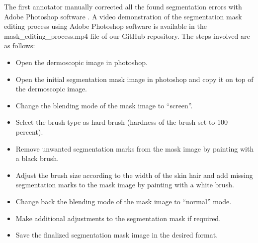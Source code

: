 The first annotator manually corrected all the found segmentation errors with Adobe Photoshop software \cite{Photoshop}. A video demonstration of the segmentation mask editing process using Adobe Photoshop software is available in the mask\_editing\_process.mp4 file of our GitHub repository. The steps involved are as follows:
\begin{itemize}
	
	\item Open the dermoscopic image in photoshop.
	\item Open the initial segmentation mask image in photoshop and copy it on top of the dermoscopic image.
	\item Change the blending mode of the mask image to “screen”.
	\item Select the brush type as hard brush (hardness of the brush set to 100 percent).
	\item Remove unwanted segmentation marks from the mask image by painting with a black brush.
	\item Adjust the brush size according to the width of the skin hair and add missing segmentation marks to the mask image by painting with a white brush. 
	\item Change back the blending mode of the mask image to “normal” mode.
	\item Make additional adjustments to the segmentation mask if required.
	\item Save the finalized segmentation mask image in the desired format.
	
\end{itemize}

